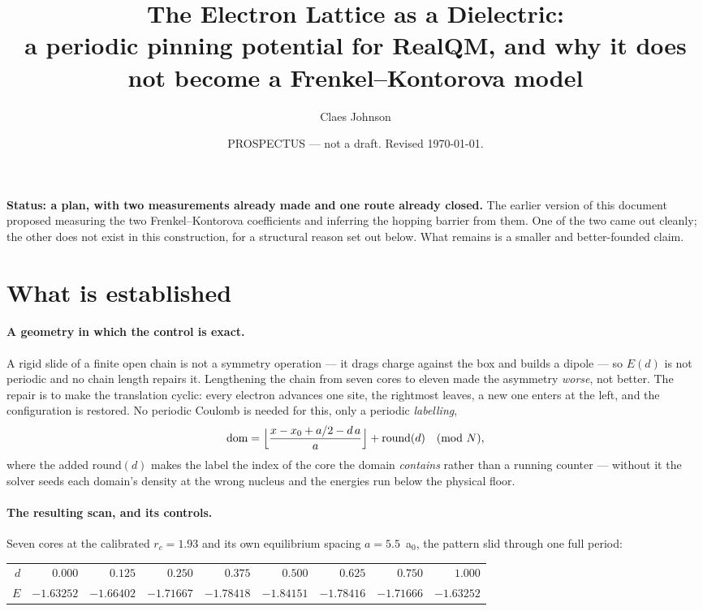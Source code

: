 \documentclass[11pt]{article}
\title{The Electron Lattice as a Dielectric:\\
       \large a periodic pinning potential for RealQM, and why it does not
       become a Frenkel--Kontorova model}
\author{Claes Johnson}
\date{PROSPECTUS --- not a draft. Revised \today.}
\begin{document}
\maketitle

\noindent\textbf{Status: a plan, with two measurements already made and one route already
closed.} The earlier version of this document proposed measuring the two Frenkel--Kontorova
coefficients and inferring the hopping barrier from them. One of the two came out cleanly; the
other does not exist in this construction, for a structural reason set out below. What remains is a
smaller and better-founded claim.

\section*{What is established}

\paragraph{A geometry in which the control is exact.} A rigid slide of a finite open chain is not a
symmetry operation --- it drags charge against the box and builds a dipole --- so $E(d)$ is not
periodic and no chain length repairs it. Lengthening the chain from seven cores to eleven made the
asymmetry \emph{worse}, not better. The repair is to make the translation cyclic: every electron
advances one site, the rightmost leaves, a new one enters at the left, and the configuration is
restored. No periodic Coulomb is needed for this, only a periodic \emph{labelling},
\[
\mathrm{dom}=\Bigl\lfloor\frac{x-x_0+a/2-d\,a}{a}\Bigr\rfloor+\mathrm{round}(d)
\quad(\mathrm{mod}\ N),
\]
where the added $\mathrm{round}(d)$ makes the label the index of the core the domain \emph{contains}
rather than a running counter --- without it the solver seeds each domain's density at the wrong
nucleus and the energies run below the physical floor.

\paragraph{The resulting scan, and its controls.} Seven cores at the calibrated $r_c=1.93$ and its
own equilibrium spacing $a=5.5$~a$_0$, the pattern slid through one full period:

\begin{center}
\small
\begin{tabular}{@{}rrrrrrrrr@{}}
\toprule
$d$ & $0.000$ & $0.125$ & $0.250$ & $0.375$ & $0.500$ & $0.625$ & $0.750$ & $1.000$\\
$E$ & $-1.63252$ & $-1.66402$ & $-1.71667$ & $-1.78418$ & $-1.84151$ & $-1.78416$ & $-1.71666$
    & $-1.63252$\\
\bottomrule
\end{tabular}
\end{center}
\end{document}
